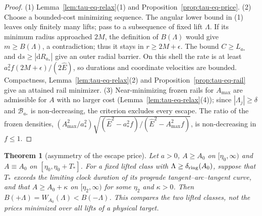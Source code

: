 \documentclass[aip,jmp,amsmath,amssymb,reprint]{revtex4-2}
\newcommand{\Ehat}{\hat E}
\newcommand{\dd}{\mathrm{d}}
\theoremstyle{plain}
\newtheorem{theorem}{Theorem}
\theoremstyle{definition}
\begin{document}
\begin{proof}
(1) Lemma~\ref{lem:tau-eq-relax}(1) and Proposition~\ref{prop:tau-eq-price}. (2) Choose a bounded-cost minimizing sequence. The angular lower bound in (1) leaves only finitely
many lifts; pass to a subsequence of fixed lift $\Lambda$. If its minimum radius approached $2M$, the
definition of $B(\Lambda)$ would give $m\ge B(\Lambda)$, a contradiction; thus it stays in
$r\ge2M+\epsilon$. The bound $C\ge L_{a_*}$ and $\dd s\ge|\dd R_{a_*}|$ give an outer radial barrier. On this
shell the rate is at least $a_*^2f(2M+\epsilon)/(2\Ehat)$, so durations and coordinate velocities are
bounded. Compactness, Lemma~\ref{lem:tau-eq-relax}(2) and Proposition~\ref{prop:tau-eq-rail} give
an attained rail minimizer. (3) Near-minimizing frozen rails for $A_{\max}$ are admissible for $A$ with no larger cost
(Lemma~\ref{lem:tau-eq-relax}(4)); since $|\Lambda_j|\ge\delta$ and $\mathcal B_{a_*}$ is non-decreasing, the
criterion excludes every escape. The ratio of the frozen densities,
$(A_{\max}^2/a_*^2)\sqrt{(\Ehat^2-a_*^2f)/(\Ehat^2-A_{\max}^2f)}$, is non-decreasing in $f\le1$.
\end{proof}

\begin{theorem}[asymmetry of the escape price]\label{thm:tau-eq-asym}
Let $a>0$, $A\ge A_0$ on $[\eta_0,\infty)$ and $A\equiv A_0$ on $[\eta_0,\eta_0+T_*]$. For a fixed lifted
class with $\Lambda\ge\delta_{\rm ring}(A_0)$, suppose that $T_*$ exceeds the limiting clock duration of its
prograde tangent--arc--tangent curve, and that $A\ge A_0+\kappa$ on $[\eta_2,\infty)$ for some $\eta_2$ and
$\kappa>0$. Then $B(+\Lambda)=W_{A_0}(\Lambda)<B(-\Lambda)$. This compares the two lifted classes, not the
prices minimized over all lifts of a physical target.
\end{theorem}
\end{document}
